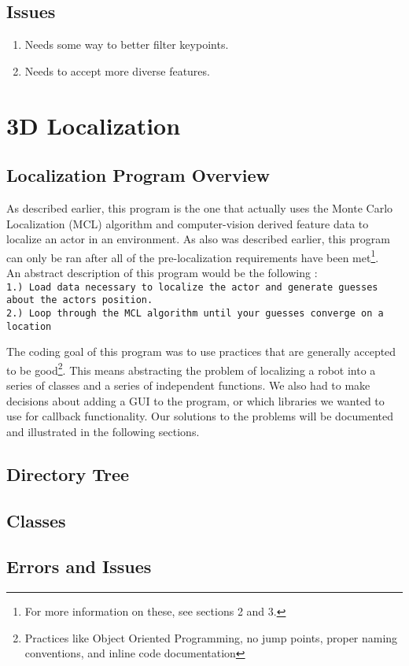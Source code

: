 \documentclass[a4paper,11pt]{article}
\begin{document}
  \subsection{Issues}
    \begin{enumerate}
      \item Needs some way to better filter keypoints.
      \item Needs to accept more diverse features.
    \end{enumerate}
    \newpage




\section{3D Localization}

  \subsection{Localization Program Overview}
  As described earlier, this program is the one that actually uses the Monte Carlo Localization (MCL) algorithm and computer-vision derived feature data to localize an actor in an environment.
  As also was described earlier, this program can only be ran after all of the pre-localization requirements have been met\footnote{For more information on these, see sections 2 and 3.}.
  \\ An abstract description of this program would be the following :
  \\ \texttt{1.) Load data necessary to localize the actor and generate guesses about the actors position.} 
  \\ \texttt{2.) Loop through the MCL algorithm until your guesses converge on a location}

  The coding goal of this program was to use practices that are generally accepted to be good\footnote{Practices like Object Oriented Programming, no jump points, proper naming conventions, and inline code documentation}.
  This means abstracting the problem of localizing a robot into a series of classes and a series of independent functions. We also had to make decisions about adding a GUI
  to the program, or which libraries we wanted to use for callback functionality. Our solutions to the problems will be documented and illustrated in the following sections.
  
  \subsection{Directory Tree}
  
  
  \subsection{Classes}
  
  
  \subsection{Errors and Issues}
  
  


  

  
\end{document}

